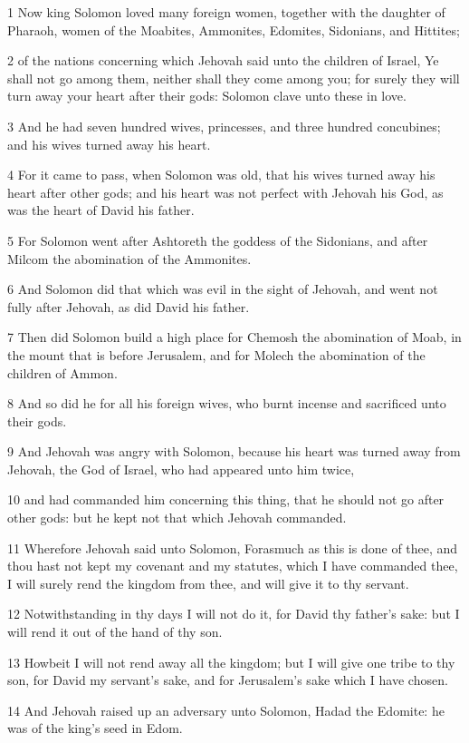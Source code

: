 \par 1 Now king Solomon loved many foreign women, together with the daughter of Pharaoh, women of the Moabites, Ammonites, Edomites, Sidonians, and Hittites;
\par 2 of the nations concerning which Jehovah said unto the children of Israel, Ye shall not go among them, neither shall they come among you; for surely they will turn away your heart after their gods: Solomon clave unto these in love.
\par 3 And he had seven hundred wives, princesses, and three hundred concubines; and his wives turned away his heart.
\par 4 For it came to pass, when Solomon was old, that his wives turned away his heart after other gods; and his heart was not perfect with Jehovah his God, as was the heart of David his father.
\par 5 For Solomon went after Ashtoreth the goddess of the Sidonians, and after Milcom the abomination of the Ammonites.
\par 6 And Solomon did that which was evil in the sight of Jehovah, and went not fully after Jehovah, as did David his father.
\par 7 Then did Solomon build a high place for Chemosh the abomination of Moab, in the mount that is before Jerusalem, and for Molech the abomination of the children of Ammon.
\par 8 And so did he for all his foreign wives, who burnt incense and sacrificed unto their gods.
\par 9 And Jehovah was angry with Solomon, because his heart was turned away from Jehovah, the God of Israel, who had appeared unto him twice,
\par 10 and had commanded him concerning this thing, that he should not go after other gods: but he kept not that which Jehovah commanded.
\par 11 Wherefore Jehovah said unto Solomon, Forasmuch as this is done of thee, and thou hast not kept my covenant and my statutes, which I have commanded thee, I will surely rend the kingdom from thee, and will give it to thy servant.
\par 12 Notwithstanding in thy days I will not do it, for David thy father's sake: but I will rend it out of the hand of thy son.
\par 13 Howbeit I will not rend away all the kingdom; but I will give one tribe to thy son, for David my servant's sake, and for Jerusalem's sake which I have chosen.
\par 14 And Jehovah raised up an adversary unto Solomon, Hadad the Edomite: he was of the king's seed in Edom.
